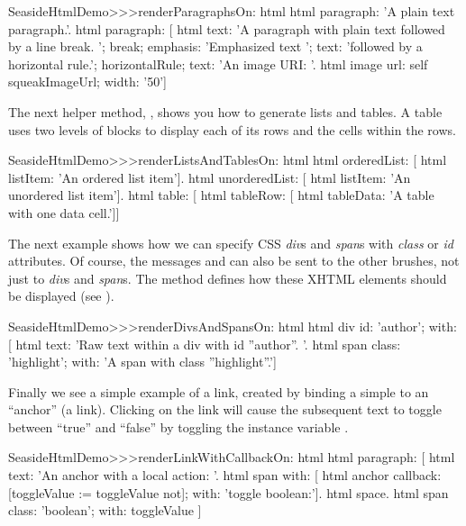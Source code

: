 \documentclass[a4paper,10pt,twoside]{book}
\begin{document}
{{\begin{code}{}
SeasideHtmlDemo>>>renderParagraphsOn: html 
	html paragraph: 'A plain text paragraph.'.
	html paragraph: [
		html
			text: 'A paragraph with plain text followed by a line break. ';
			break;
			emphasis: 'Emphasized text ';
			text: 'followed by a horizontal rule.';
			horizontalRule;
			text: 'An image URI: '.
		html image
			url: self squeakImageUrl;
			width: '50']
\end{code}

The next helper method, , shows you how to generate lists and tables.
A table uses two levels of blocks to display each of its rows and the cells within the rows.

\begin{code}{}
SeasideHtmlDemo>>>renderListsAndTablesOn: html 
	html orderedList: [
		html listItem: 'An ordered list item'].
	html unorderedList: [
		html listItem: 'An unordered list item'].
	html table: [
		html tableRow: [
			html tableData: 'A table with one data cell.']]
\end{code}

The next example shows how we can specify CSS \emph{div}s and \emph{span}s with \emph{class} or \emph{id} attributes.
Of course, the messages  and  can also be sent to the other brushes, not just to \emph{div}s and \emph{span}s.
The method  defines how these XHTML elements should be displayed (see ).

\begin{code}{}
SeasideHtmlDemo>>>renderDivsAndSpansOn: html 
	html div
		id: 'author';
		with: [
			html text: 'Raw text within a div with id ''author''. '.
			html span
				class: 'highlight';
				with: 'A span with class ''highlight''.']
\end{code}

Finally we see a simple example of a link, created by binding a simple  to an ``anchor'' (\ie a link).
Clicking on the link will cause the subsequent text to toggle between ``true'' and ``false'' by toggling the instance variable .

\begin{code}{}
SeasideHtmlDemo>>>renderLinkWithCallbackOn: html 
	html paragraph: [
		html text: 'An anchor with a local action: '.
		html span with: [
			html anchor
				callback: [toggleValue := toggleValue not];
				with: 'toggle boolean:'].
		html space.
		html span
			class: 'boolean';
			with: toggleValue ]
\end{code}

}}
\end{document}
